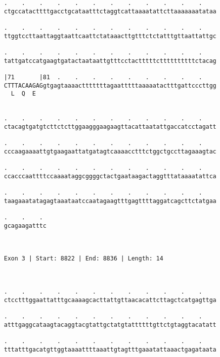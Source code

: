 \documentclass{article}
\begin{document}
\begin{Verbatim}
.    .    .    .    .    .    .    .    .    .    .    .    
ctgccatacttttgacctgcataatttctaggtcattaaaatattcttaaaaaaatataa
                                                            
.    .    .    .    .    .    .    .    .    .    .    .    
ttggtccttaattaggtaattcaattctataaacttgtttctctatttgttaattattgc
                                                            
.    .    .    .    .    .    .    .    .    .    .    .    
tattgatccatgaagtgatactaataattgtttcctactttttcttttttttttctacag
                                                            
|71       |81  .    .    .    .    .    .    .    .    .    
CTTTACAAGAGgtgagtaaaactttttttagaatttttaaaaatactttgattcccttgg
  L  Q  E                                                   
                                                            
  
.    .    .    .    .    .    .    .    .    .    .    .    
ctacagtgatgtcttctcttggaagggaagaagttacattaatattgaccatcctagatt
                                                            
.    .    .    .    .    .    .    .    .    .    .    .    
cccaagaaaattgtgaagaattatgatagtcaaaacctttctggctgccttagaaagtac
                                                            
.    .    .    .    .    .    .    .    .    .    .    .    
ccacccaattttccaaaataggcggggctactgaataagactaggtttataaaatattca
                                                            
.    .    .    .    .    .    .    .    .    .    .    .    
taagaaatatagagtaaataatccaatagaagtttgagttttaggatcagcttctatgaa
                                                            
.    .    . 
gcagaagatttc
            
            
 
Exon 3 | Start: 8822 | End: 8836 | Length: 14



.    .    .    .    .    .    .    .    .    .    .    .    
ctcctttggaattatttgcaaaagcacttattgttaacacattcttagctcatgagttga
                                                            
.    .    .    .    .    .    .    .    .    .    .    .    
atttgaggcataagtacaggtacgtattgctatgtattttttgttctgtaggtacatatt
                                                            
.    .    .    .    .    .    .    .    .    .    .    .    
tttatttgacatgttggtaaaattttaaattgtagtttgaaatattaaactgagataata
                                                            

\end{Verbatim}
\end{document}
